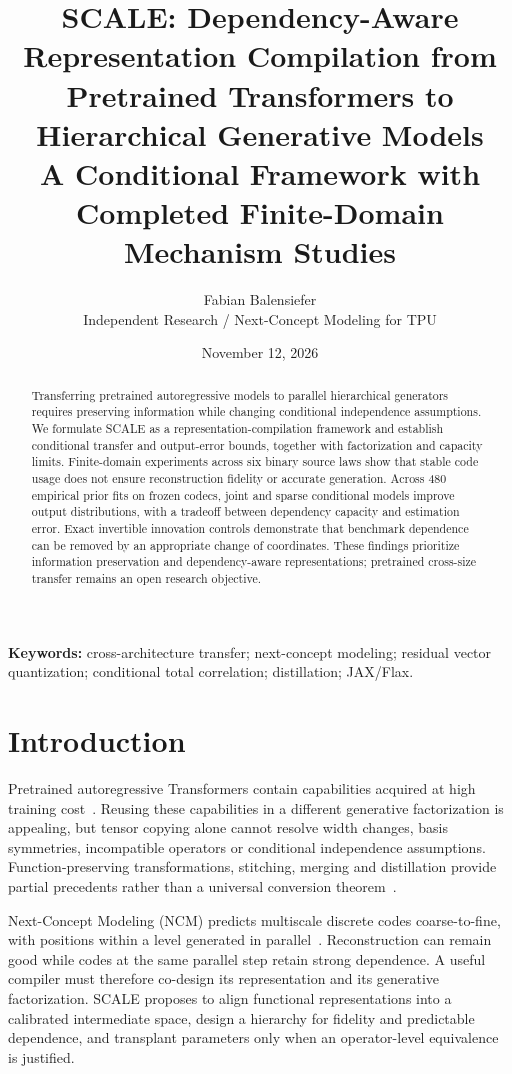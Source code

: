 \documentclass[11pt,a4paper]{article}
\title{SCALE: Dependency-Aware Representation Compilation from Pretrained Transformers to Hierarchical Generative Models\\[0.5em]\large A Conditional Framework with Completed Finite-Domain Mechanism Studies}
\author{Fabian Balensiefer\\\small Independent Research / Next-Concept Modeling for TPU}
\date{November 12, 2026}
\begin{document}
\maketitle
\begin{abstract}
Transferring pretrained autoregressive models to parallel hierarchical generators
requires preserving information while changing conditional independence
assumptions. We formulate SCALE as a representation-compilation framework and
establish conditional transfer and output-error bounds, together with
factorization and capacity limits. Finite-domain experiments across six binary
source laws show that stable code usage does not ensure reconstruction fidelity
or accurate generation. Across 480 empirical prior fits on frozen codecs, joint
and sparse conditional models improve output distributions, with a tradeoff
between dependency capacity and estimation error. Exact invertible innovation
controls demonstrate that benchmark dependence can be removed by an appropriate
change of coordinates. These findings prioritize information preservation and
dependency-aware representations; pretrained cross-size transfer remains an
open research objective.
\end{abstract}
\noindent\textbf{Keywords:} cross-architecture transfer; next-concept modeling;
residual vector quantization; conditional total correlation; distillation; JAX/Flax.

\section{Introduction}
Pretrained autoregressive Transformers contain capabilities acquired at high
training cost~\citep{vaswani2017attention,biderman2023}. Reusing these capabilities
in a different generative factorization is appealing, but tensor copying alone
cannot resolve width changes, basis symmetries, incompatible operators or
conditional independence assumptions. Function-preserving transformations,
stitching, merging and distillation provide partial precedents rather than a
universal conversion theorem~\citep{chen2016net2net,hinton2015,ainsworth2022,chen2025stitch,wang2024mamba}.

Next-Concept Modeling (NCM) predicts multiscale discrete codes coarse-to-fine,
with positions within a level generated in parallel~\citep{kumbong2026ncm}.
Reconstruction can remain good while codes at the same parallel step retain
strong dependence. A useful compiler must therefore co-design its
representation and its generative factorization. SCALE proposes to align
functional representations into a calibrated intermediate space, design a
hierarchy for fidelity and predictable dependence, and transplant parameters
only when an operator-level equivalence is justified.
\end{document}
